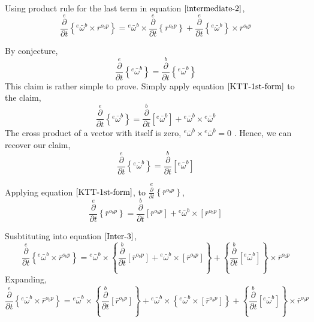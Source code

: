 \documentclass[a4paper, 12pt]{report}
\begin{document}
\begin{center}
Using product rule for the last term in equation $\ref{intermediate-2}$, 
\begin{equation}\overset{e}{\frac{\partial}{\partial t}}\left\{{}^{e}\bar{\omega}^{b}\times\bar{r}^{o_{b}p}\right\} = {}^{e}\bar{\omega}^{b}\times\overset{e}{\frac{\partial}{\partial t}}\left\{\bar{r}^{o_{b}p}\right\}  +  \overset{e}{\frac{\partial}{\partial t}}\left\{{}^{e}\bar{\omega}^{b}\right\}\times\bar{r}^{o_{b}p}\label{Inter-3}\end{equation}

By conjecture,
$$\overset{e}{\frac{\partial}{\partial t}}\left\{{}^{e}\bar{\omega}^{b}\right\} = \overset{b}{\frac{\partial}{\partial t}}\left\{{}^{e}\bar{\omega}^{b}\right\}$$
This claim is rather simple to prove. Simply apply equation $\ref{KTT-1st-form}$ to the claim, 
$$\overset{e}{\frac{\partial}{\partial t}}\left\{{}^{e}\bar{\omega}^{b}\right\} = \overset{b}{\frac{\partial}{\partial t}}[{}^{e}\bar{\omega}^{b}] + {}^{e}\bar{\omega}^{b}\times{}^{e}\bar{\omega}^{b}$$
The cross product of a vector with itself is zero, $\displaystyle {}^{e}\bar{\omega}^{b}\times{}^{e}\bar{\omega}^{b} = 0$ . Hence, we can recover our claim,
$$\overset{e}{\frac{\partial}{\partial t}}\left\{{}^{e}\bar{\omega}^{b}\right\} = \overset{b}{\frac{\partial}{\partial t}}[{}^{e}\bar{\omega}^{b}]$$

Applying equation $\ref{KTT-1st-form}$, to $\displaystyle \overset{e}{\frac{\partial}{\partial t}}\left\{\bar{r}^{o_{b}p}\right\}$,
$$\overset{e}{\frac{\partial}{\partial t}}\left\{\bar{r}^{o_{b}p}\right\} = \overset{b}{\frac{\partial}{\partial t}}\left[\bar{r}^{o_{b}p}\right] + {}^{e}\bar{\omega}^{b}\times\left[\bar{r}^{o_{b}p}\right]$$

Susbtituting into equation $\ref{Inter-3}$,
$$\overset{e}{\frac{\partial}{\partial t}}\left\{{}^{e}\bar{\omega}^{b}\times\bar{r}^{o_{b}p}\right\} = {}^{e}\bar{\omega}^{b}\times\left\{\overset{b}{\frac{\partial}{\partial t}}\left[\bar{r}^{o_{b}p}\right] + {}^{e}\bar{\omega}^{b}\times\left[\bar{r}^{o_{b}p}\right]\right\}    + \left\{\overset{b}{\frac{\partial}{\partial t}}[{}^{e}\bar{\omega}^{b}]\right\}\times\bar{r}^{o_{b}p}$$
Expanding,
\begin{equation}\overset{e}{\frac{\partial}{\partial t}}\left\{{}^{e}\bar{\omega}^{b}\times\bar{r}^{o_{b}p}\right\} = {}^{e}\bar{\omega}^{b}\times\left\{\overset{b}{\frac{\partial}{\partial t}}\left[\bar{r}^{o_{b}p}\right]\right\}   +   {}^{e}\bar{\omega}^{b}\times\left\{{}^{e}\bar{\omega}^{b}\times\left[\bar{r}^{o_{b}p}\right]\right\}    +    \left\{\overset{b}{\frac{\partial}{\partial t}}[{}^{e}\bar{\omega}^{b}]\right\}\times\bar{r}^{o_{b}p}\label{whammu-2}\end{equation}


\end{center}
\end{document}
